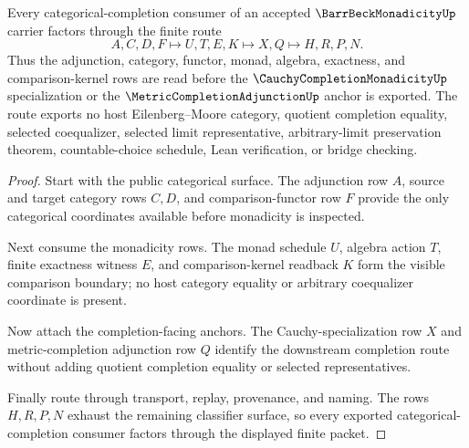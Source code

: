 \begin{theorem}
\label{thm:barr-beck-monadicity-comparison-route}
Every categorical-completion consumer of an accepted $\BarrBeckMonadicityUp$ carrier factors through the finite route
$$
A,C,D,F \longmapsto U,T,E,K \longmapsto X,Q \longmapsto H,R,P,N .
$$
Thus the adjunction, category, functor, monad, algebra, exactness, and comparison-kernel rows are read before the $\CauchyCompletionMonadicityUp$ specialization or the $\MetricCompletionAdjunctionUp$ anchor is exported. The route exports no host Eilenberg--Moore category, quotient completion equality, selected coequalizer, selected limit representative, arbitrary-limit preservation theorem, countable-choice schedule, Lean verification, or bridge checking.
\end{theorem}
\begin{proof}
Start with the public categorical surface. The adjunction row $A$, source and target category rows $C,D$, and comparison-functor row $F$ provide the only categorical coordinates available before monadicity is inspected.

Next consume the monadicity rows. The monad schedule $U$, algebra action $T$, finite exactness witness $E$, and comparison-kernel readback $K$ form the visible comparison boundary; no host category equality or arbitrary coequalizer coordinate is present.

Now attach the completion-facing anchors. The Cauchy-specialization row $X$ and metric-completion adjunction row $Q$ identify the downstream completion route without adding quotient completion equality or selected representatives.

Finally route through transport, replay, provenance, and naming. The rows $H,R,P,N$ exhaust the remaining classifier surface, so every exported categorical-completion consumer factors through the displayed finite packet.
\end{proof}


